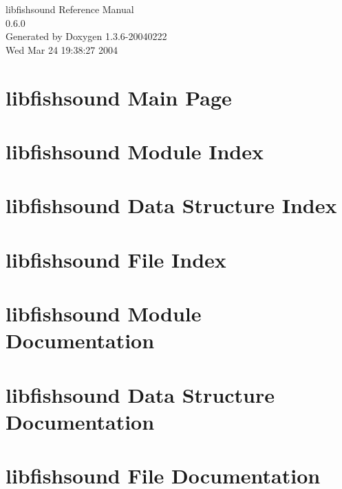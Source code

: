 \documentclass[a4paper]{book}
\begin{document}
\begin{titlepage}
\vspace*{7cm}
\begin{center}
{\Large libfishsound Reference Manual\\[1ex]\large 0.6.0 }\\
\vspace*{1cm}
{\large Generated by Doxygen 1.3.6-20040222}\\
\vspace*{0.5cm}
{\small Wed Mar 24 19:38:27 2004}\\
\end{center}
\end{titlepage}
\clearemptydoublepage
{}
\tableofcontents
\clearemptydoublepage
{}
\chapter{libfishsound Main Page}
\label{index}
\chapter{libfishsound Module Index}

\chapter{libfishsound Data Structure Index}

\chapter{libfishsound File Index}

\chapter{libfishsound Module Documentation}







\chapter{libfishsound Data Structure Documentation}


\chapter{libfishsound File Documentation}


\printindex
\end{document}
